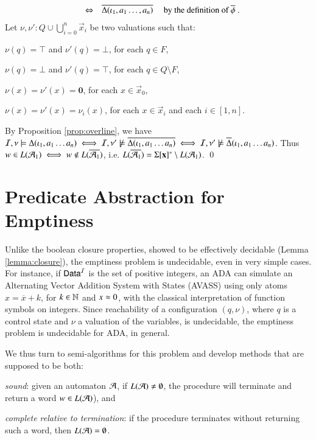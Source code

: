 \documentclass{llncs}
\begin{document}
{\[\begin{array}{rcll}
  & \Leftrightarrow & \overline{\Delta(\iota_1,a_1\ldots,a_n)} & \text{ by the definition of $\overline{\phi}$ .}
  \end{array}\]
  Let $\nu,\nu' : Q \cup \bigcup_{i=0}^n\vec{x}_i$ be two valuations
  such that: \begin{compactitem}
  \item $\nu(q) = \top$ and $\nu'(q) = \bot$, for each $q \in F$, 
  \item $\nu(q) = \bot$ and $\nu'(q) = \top$, for each $q \in Q \setminus F$, 
  \item $\nu(x) = \nu'(x) = \mathbf{0}$, for each $x \in \vec{x}_0$, 
  \item $\nu(x) = \nu'(x) = \nu_i(x)$, for each $x \in \vec{x}_i$ and each $i
    \in [1,n]$.
  \end{compactitem}
  By Proposition \ref{prop:overline}, we have $\mathcal{I},\nu \models
  \Delta(\iota_1,a_1 \ldots a_n) \iff \mathcal{I},\nu' \not\models
  \overline{\Delta(\iota_1,a_1 \ldots a_n)} \iff \mathcal{I},\nu' \not\models
  \overline{\Delta}(\iota_1,a_1 \ldots a_n)$. Thus $w \in L(\mathcal{A}_1) \iff
  w \not\in L(\overline{\mathcal{A}_1})$, i.e. $L(\overline{\mathcal{A}_1}) =
  \Sigma[\mathbf x]^* \setminus L(\mathcal{A}_1)$. \qed}

\section{Predicate Abstraction for Emptiness}

Unlike the boolean closure properties, showed to be effectively
decidable (Lemma \ref{lemma:closure}), the emptiness problem is
undecidable, even in very simple cases. For instance, if $\mathsf{Data}^{\mathcal{I}}$ is
the set of positive integers, an ADA can simulate an Alternating
Vector Addition System with States (AVASS) \cite{LazicSchmitz14} using
only atoms $x = \overline{x} + k$, for $k \in {\bf \mathbb{N}}$ and $x \approx 0$,
with the classical interpretation of function symbols on
integers. Since reachability of a configuration $(q,\nu)$, where $q$
is a control state and $\nu$ a valuation of the variables, is
undecidable, the emptiness problem is undecidable for ADA, in general. 

We thus turn to semi-algorithms for this problem and develop methods
that are supposed to be both: \begin{compactenum}
\item \emph{sound}: given an automaton $\mathcal{A}$, if $L(\mathcal{A}) \neq\emptyset$,
  the procedure will terminate and return a word $w \in L(\mathcal{A})$), and
%
\item \emph{complete relative to termination}: if the procedure terminates
  without returning such a word, then $L(\mathcal{A}) = \emptyset$. 
\end{compactenum}


 

\end{document}
